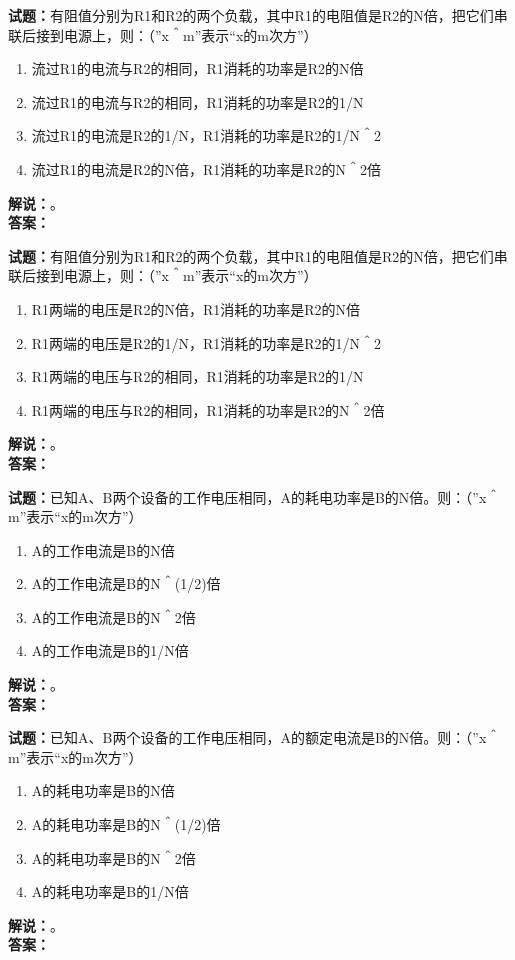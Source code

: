 \documentclass{ctexbook}
\begin{document}
\bigskip

\noindent\textbf{试题：}有阻值分别为R1和R2的两个负载，其中R1的电阻值是R2的N倍，把它们串联后接到电源上，则：（”x＾m”表示“x的m次方”）
\begin{enumerate}[leftmargin=3em]
  \item 流过R1的电流与R2的相同，R1消耗的功率是R2的N倍
  \item 流过R1的电流与R2的相同，R1消耗的功率是R2的1/N
  \item 流过R1的电流是R2的1/N，R1消耗的功率是R2的1/N＾2
  \item 流过R1的电流是R2的N倍，R1消耗的功率是R2的N＾2倍
\end{enumerate}
\noindent\textbf{解说：}\textbf{}。\\\noindent\textbf{答案：}

\bigskip

\noindent\textbf{试题：}有阻值分别为R1和R2的两个负载，其中R1的电阻值是R2的N倍，把它们串联后接到电源上，则：（”x＾m”表示“x的m次方”）
\begin{enumerate}[leftmargin=3em]
  \item R1两端的电压是R2的N倍，R1消耗的功率是R2的N倍
  \item R1两端的电压是R2的1/N，R1消耗的功率是R2的1/N＾2
  \item R1两端的电压与R2的相同，R1消耗的功率是R2的1/N
  \item R1两端的电压与R2的相同，R1消耗的功率是R2的N＾2倍
\end{enumerate}
\noindent\textbf{解说：}\textbf{}。\\\noindent\textbf{答案：}

\bigskip

\noindent\textbf{试题：}已知A、B两个设备的工作电压相同，A的耗电功率是B的N倍。则：（”x＾m”表示“x的m次方”）
\begin{enumerate}[leftmargin=3em]
  \item A的工作电流是B的N倍
  \item A的工作电流是B的N＾(1/2)倍
  \item A的工作电流是B的N＾2倍
  \item A的工作电流是B的1/N倍
\end{enumerate}
\noindent\textbf{解说：}\textbf{}。\\\noindent\textbf{答案：}

\bigskip

\noindent\textbf{试题：}已知A、B两个设备的工作电压相同，A的额定电流是B的N倍。则：（”x＾m”表示“x的m次方”）
\begin{enumerate}[leftmargin=3em]
  \item A的耗电功率是B的N倍
  \item A的耗电功率是B的N＾(1/2)倍
  \item A的耗电功率是B的N＾2倍
  \item A的耗电功率是B的1/N倍
\end{enumerate}
\noindent\textbf{解说：}\textbf{}。\\\noindent\textbf{答案：}
\end{document}
